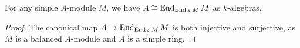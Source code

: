 \begin{lemma}\label{lem:iso-end-end}
  For any simple $A$-module $M$, we have $A \cong \operatorname{End}_{\operatorname{End}_{A}M}M$ as $k$-algebras.
\end{lemma}
\begin{proof}
  The canonical map $A \to \operatorname{End}_{\operatorname{End}_{A}M}M$ is both injective and surjective, as $M$ is a balanced $A$-module and $A$ is a simple ring.
\end{proof}

